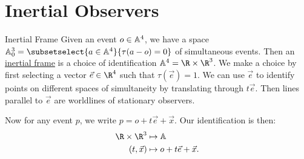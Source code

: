 \documentclass[../Main.tex]{subfiles}
\begin{document}
\section{Inertial Observers}
\begin{definition}{Inertial Frame}
    Given an event $o \in \mathbb{A}^4$, we have a space $\A^3_0 = \subsetselect{a \in \A^4}{\tau(a - o) = 0}$ of simultaneous events. Then an \underline{inertial frame} is a choice of identification $\A^4 = \R \times \R^3$. We make a choice by first selecting a vector $\vec{e} \in \R^4$ such that $\tau(\vec{e}) = 1$. We can use $\vec{e}$ to identify points on different spaces of simultaneity by translating through $t \vec{e}$. Then lines parallel to $\vec{e}$ are worldlines of stationary observers.

    Now for any event $p$, we write $p = o + t\vec{e} + \vec{x}$. Our identification is then:
    \begin{align*}
        \R \times \R^3 &\mapsto \A\\
        (t, \vec{x}) &\mapsto o + t\vec{e} + \vec{x}.
    \end{align*}
\end{definition}
\end{document}
